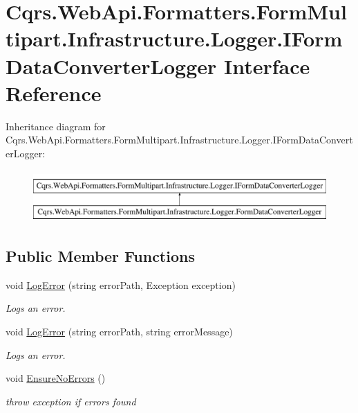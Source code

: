 \hypertarget{interfaceCqrs_1_1WebApi_1_1Formatters_1_1FormMultipart_1_1Infrastructure_1_1Logger_1_1IFormDataConverterLogger}{}\section{Cqrs.\+Web\+Api.\+Formatters.\+Form\+Multipart.\+Infrastructure.\+Logger.\+I\+Form\+Data\+Converter\+Logger Interface Reference}
\label{interfaceCqrs_1_1WebApi_1_1Formatters_1_1FormMultipart_1_1Infrastructure_1_1Logger_1_1IFormDataConverterLogger}
Inheritance diagram for Cqrs.\+Web\+Api.\+Formatters.\+Form\+Multipart.\+Infrastructure.\+Logger.\+I\+Form\+Data\+Converter\+Logger\+:\begin{figure}[H]
\begin{center}
\leavevmode
\includegraphics[height=2.000000cm]{interfaceCqrs_1_1WebApi_1_1Formatters_1_1FormMultipart_1_1Infrastructure_1_1Logger_1_1IFormDataConverterLogger}
\end{center}
\end{figure}
\subsection*{Public Member Functions}
\begin{DoxyCompactItemize}
\item 
void \hyperlink{interfaceCqrs_1_1WebApi_1_1Formatters_1_1FormMultipart_1_1Infrastructure_1_1Logger_1_1IFormDataConverterLogger_a7da0b7749a50f6fed2cb5ab0d8efef2a}{Log\+Error} (string error\+Path, Exception exception)
\begin{DoxyCompactList}\small\item\em Logs an error. \end{DoxyCompactList}\item 
void \hyperlink{interfaceCqrs_1_1WebApi_1_1Formatters_1_1FormMultipart_1_1Infrastructure_1_1Logger_1_1IFormDataConverterLogger_a0067054a5f882d2687e8fd9f9ae38e9b}{Log\+Error} (string error\+Path, string error\+Message)
\begin{DoxyCompactList}\small\item\em Logs an error. \end{DoxyCompactList}\item 
void \hyperlink{interfaceCqrs_1_1WebApi_1_1Formatters_1_1FormMultipart_1_1Infrastructure_1_1Logger_1_1IFormDataConverterLogger_a53cf31f01e5ceb5efcc8ed3d874c319a}{Ensure\+No\+Errors} ()
\begin{DoxyCompactList}\small\item\em throw exception if errors found \end{DoxyCompactList}\end{DoxyCompactItemize}


